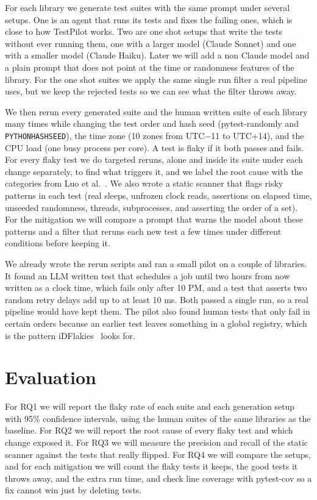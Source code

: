 \documentclass[sigconf,nonacm]{acmart}
\begin{document}
For each library we generate test suites with the same prompt under several setups. One is an agent that runs its tests and fixes the failing ones, which is close to how TestPilot works. Two are one shot setups that write the tests without ever running them, one with a larger model (Claude Sonnet) and one with a smaller model (Claude Haiku). Later we will add a non Claude model and a plain prompt that does not point at the time or randomness features of the library. For the one shot suites we apply the same single run filter a real pipeline uses, but we keep the rejected tests so we can see what the filter throws away.

We then rerun every generated suite and the human written suite of each library many times while changing the test order and hash seed (pytest-randomly and \texttt{PYTHONHASHSEED}), the time zone (10 zones from UTC$-$11 to UTC$+$14), and the CPU load (one busy process per core). A test is flaky if it both passes and fails. For every flaky test we do targeted reruns, alone and inside its suite under each change separately, to find what triggers it, and we label the root cause with the categories from Luo et al.~\cite{luo2014}. We also wrote a static scanner that flags risky patterns in each test (real sleeps, unfrozen clock reads, assertions on elapsed time, unseeded randomness, threads, subprocesses, and asserting the order of a set). For the mitigation we will compare a prompt that warns the model about these patterns and a filter that reruns each new test a few times under different conditions before keeping it.

We already wrote the rerun scripts and ran a small pilot on a couple of libraries. It found an LLM written test that schedules a job until two hours from now written as a clock time, which fails only after 10 PM, and a test that asserts two random retry delays add up to at least 10 ms. Both passed a single run, so a real pipeline would have kept them. The pilot also found human tests that only fail in certain orders because an earlier test leaves something in a global registry, which is the pattern iDFlakies~\cite{lam2019} looks for.

\section{Evaluation}
For RQ1 we will report the flaky rate of each suite and each generation setup with 95\% confidence intervals, using the human suites of the same libraries as the baseline. For RQ2 we will report the root cause of every flaky test and which change exposed it. For RQ3 we will measure the precision and recall of the static scanner against the tests that really flipped. For RQ4 we will compare the setups, and for each mitigation we will count the flaky tests it keeps, the good tests it throws away, and the extra run time, and check line coverage with pytest-cov so a fix cannot win just by deleting tests.
\end{document}
